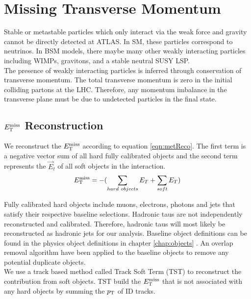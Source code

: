\section{Missing Transverse Momentum}
\label{sec:reco:MET}

\indent Stable or metastable particles which only interact via the weak force and gravity cannot be directly detected at ATLAS.  In SM, these particles correspond to neutrinos.  In BSM models, there maybe many other weakly interacting particles including WIMPs, gravitons, and a stable neutral SUSY LSP. \\

\indent The presence of weakly interacting particles is inferred through conservation of transverse momentum.  The total transverse momentum is zero in the initial colliding partons at the LHC.  Therefore, any momentum imbalance in the transverse plane must be due to undetected particles in the final state.  \\

\subsection{$E_{\mathrm{T}}^{\mathrm{miss}}$ Reconstruction}
\label{sec:MET:reco}

\indent We reconstruct the $E_{\mathrm{T}}^{\mathrm{miss}}$ according to equation \ref{eqn:metReco}.  The first term is a negative vector sum of all hard fully calibrated objects and the second term represents the $\vec{E}_t$ of all soft objects in the interaction.  \\

\begin{equation}
E_{\mathrm{T}}^{\mathrm{miss}} = - ( \sum_{hard~objects} E_T + \sum_{soft} E_T ) 
\label{eqn:metReco}
\end{equation}

\indent Fully calibrated hard objects include muons, electrons, photons and jets that satisfy their respective baseline selections.  Hadronic taus are not independently reconstructed and calibrated.  Therefore, hadronic taus will most likely be reconstructed as hadronic jets for our analysis.  Baseline object definitions can be found in the physics object definitions in chapter \ref{chap:objects} .  An overlap removal algorithm have been applied to the baseline objects to remove any potential duplicate objects. \\

\indent We use a track based method called Track Soft Term (TST) \cite{METReco} to reconstruct the contribution from soft objects.  TST build the $E_{\mathrm{T}}^{\mathrm{miss}}$ that is not associated with any hard objects by summing the $p_{\mathrm{T}}$ of ID tracks. \\


